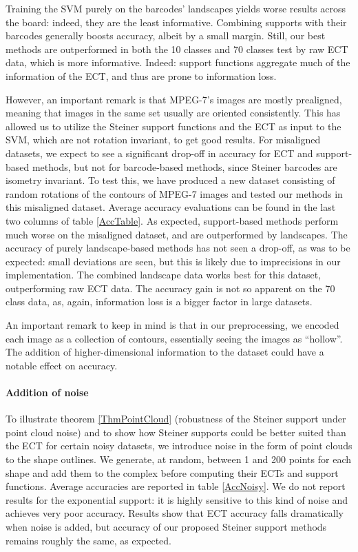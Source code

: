 \documentclass[a4paper]{article}
\begin{document}
Training the SVM purely on the barcodes' landscapes yields worse results across the board: indeed, they are the least informative. Combining supports with their barcodes generally boosts accuracy, albeit by a small margin. Still, our best methods are outperformed in both the 10 classes and 70 classes test by raw ECT data, which is more informative. Indeed: support functions aggregate much of the information of the ECT, and thus are prone to information loss.

However, an important remark is that MPEG-7's images are mostly prealigned, meaning that images in the same set usually are oriented consistently. This has allowed us to utilize the Steiner support functions and the ECT as input to the SVM, which are not rotation invariant, to get good results. For misaligned datasets, we expect to see a significant drop-off in accuracy for ECT and support-based methods, but not for barcode-based methods, since Steiner barcodes are isometry invariant. To test this, we have produced a new dataset consisting of random rotations of the contours of MPEG-7 images and tested our methods in this misaligned dataset. Average accuracy evaluations can be found in the last two columns of table \ref{AccTable}. As expected, support-based methods perform much worse on the misaligned dataset, and are outperformed by landscapes. The accuracy of purely landscape-based methods has not seen a drop-off, as was to be expected: small deviations are seen, but this is likely due to imprecisions in our implementation. The combined landscape data works best for this dataset, outperforming raw ECT data. The accuracy gain is not so apparent on the 70 class data, as, again, information loss is a bigger factor in large datasets.

An important remark to keep in mind is that in our preprocessing, we encoded each image as a collection of contours, essentially seeing the images as ``hollow''. The addition of higher-dimensional information to the dataset could have a notable effect on accuracy. 

\paragraph{Addition of noise}

To illustrate theorem \ref{ThmPointCloud} (robustness of the Steiner support under point cloud noise) and to show how Steiner supports could be better suited than the ECT for certain noisy datasets, we introduce noise in the form of point clouds to the shape outlines. We generate, at random, between 1 and 200 points for each shape and add them to the complex before computing their ECTs and support functions. Average accuracies are reported in table \ref{AccNoisy}. We do not report results for the exponential support: it is highly sensitive to this kind of noise and achieves very poor accuracy. Results show that ECT accuracy falls dramatically when noise is added, but accuracy of our proposed Steiner support methods remains roughly the same, as expected.
 
\end{document}
